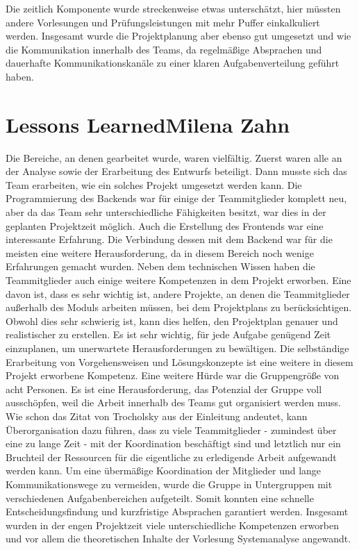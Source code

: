 		Die zeitlich Komponente wurde streckenweise etwas unterschätzt, hier müssten andere Vorlesungen und Prüfungsleistungen mit mehr Puffer einkalkuliert werden. Insgesamt wurde die Projektplanung aber ebenso gut umgesetzt und wie die Kommunikation innerhalb des Teams, da regelmäßige Absprachen und dauerhafte Kommunikationskanäle zu einer klaren Aufgabenverteilung geführt haben.
		
	
	\section[Lessons Learned]{Lessons Learned{\hfill \normalsize Milena Zahn}} \label{Ausblick} 
	Die Bereiche, an denen gearbeitet wurde, waren vielfältig. Zuerst waren alle an der Analyse sowie der Erarbeitung des Entwurfs beteiligt. Dann musste sich das Team erarbeiten, wie ein solches Projekt umgesetzt werden kann. Die Programmierung des Backends war für einige der Teammitglieder komplett neu, aber da das Team sehr unterschiedliche Fähigkeiten besitzt, war dies in der geplanten Projektzeit möglich. Auch die Erstellung des Frontends war eine interessante Erfahrung. Die Verbindung dessen mit dem Backend war für die meisten eine weitere Herausforderung, da in diesem Bereich noch wenige Erfahrungen gemacht wurden. 
	Neben dem technischen Wissen haben die Teammitglieder auch einige weitere Kompetenzen in dem Projekt erworben. Eine davon ist, dass es sehr wichtig ist, andere Projekte, an denen die Teammitglieder außerhalb des Moduls arbeiten müssen, bei dem Projektplans zu berücksichtigen. Obwohl dies sehr schwierig ist, kann dies helfen, den Projektplan genauer und realistischer zu erstellen. Es ist sehr wichtig, für jede Aufgabe genügend Zeit einzuplanen, um unerwartete Herausforderungen zu bewältigen. Die selbständige Erarbeitung von Vorgehensweisen und Lösungskonzepte ist eine weitere in diesem Projekt erworbene Kompetenz.
	Eine weitere Hürde war die Gruppengröße von acht Personen. Es ist eine Herausforderung, das Potenzial der Gruppe voll ausschöpfen, weil die Arbeit innerhalb des Teams gut organisiert werden muss. 
	Wie schon das Zitat von Trocholsky aus der Einleitung andeutet, kann Überorganisation dazu führen, dass zu viele Teammitglieder - zumindest über eine zu lange Zeit - mit der Koordination beschäftigt sind und letztlich nur ein Bruchteil der Ressourcen für die eigentliche zu erledigende Arbeit aufgewandt werden kann.
	Um eine übermäßige Koordination der Mitglieder und lange Kommunikationswege zu vermeiden, wurde die Gruppe in Untergruppen mit verschiedenen Aufgabenbereichen aufgeteilt. Somit konnten eine schnelle Entscheidungsfindung und kurzfristige Absprachen garantiert werden. Insgesamt wurden in der engen Projektzeit viele unterschiedliche Kompetenzen erworben und vor allem die theoretischen Inhalte der Vorlesung Systemanalyse angewandt.
	
